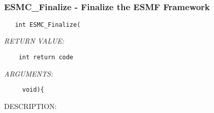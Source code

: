    
 
\mbox{}\hrulefill\ 
 
\subsubsection [ESMC\_Finalize] {ESMC\_Finalize - Finalize the ESMF Framework}


  
\begin{verbatim}   int ESMC_Finalize(\end{verbatim}{\em RETURN VALUE:}
\begin{verbatim}    int return code\end{verbatim}{\em ARGUMENTS:}
\begin{verbatim}     void){
    \end{verbatim}
{\sf DESCRIPTION:\\ }


  
\setlength{\parskip}{\oldparskip}
\setlength{\parindent}{\oldparindent}
\setlength{\baselineskip}{\oldbaselineskip}
